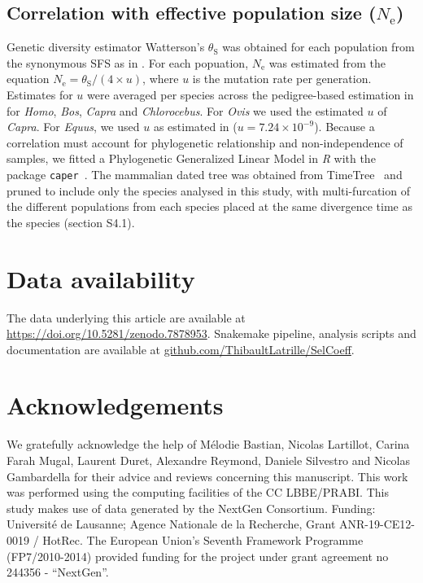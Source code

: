 \documentclass{article}
\newcommand{\Ne}{N_{\text{e}}}
\newcommand{\thetaSyn}{\theta_{\text{S}}}
\providecommand{\DIFaddtex}[1]{{\protect\color{blue}\uwave{#1}}} %
\providecommand{\DIFaddbegin}{} %
\providecommand{\DIFaddend}{} %
\providecommand{\DIFadd}[1]{\texorpdfstring{\DIFaddtex{#1}}{#1}} %
\newcommand{\DIFaddincludegraphics}[2][]{{\color{blue}\fbox{\DIFOincludegraphics[#1]{#2}}}} %
\DeclareRobustCommand{\DIFaddbegin}{\DIFOaddbegin \let\includegraphics\DIFaddincludegraphics} %
\DeclareRobustCommand{\DIFaddend}{\DIFOaddend \let\includegraphics\DIFOincludegraphics} %
\begin{document}
    \subsection{Correlation with effective population size ($\Ne$)}
    \label{subsec:correlation-diversity}
    Genetic diversity estimator Watterson's $\thetaSyn$ was obtained for each population from the synonymous SFS as in \textcite{achaz_frequency_2009}.
    For each popuation, $\Ne$ was estimated from the equation $\Ne=\thetaSyn / (4 \times u)$, where $u$ is the mutation rate per generation.
    Estimates for $u$ were averaged per species across the pedigree-based estimation in \textcite{bergeron_evolution_2023} for \textit{Homo}, \textit{Bos}, \textit{Capra} and \textit{Chlorocebus}.
    For \textit{Ovis} we used the estimated $u$ of \textit{Capra}.
    For \textit{Equus}, we used $u$ as estimated in \textcite{orlando_recalibrating_2013} ($u=7.24\times10^{-9}$).
    Because a correlation must account for phylogenetic relationship and non-independence of samples, we fitted a Phylogenetic Generalized Linear Model in \textit{R} with the \DIFaddbegin \DIFadd{method }\texttt{\DIFadd{pgls}} \DIFadd{with default settings from the }\DIFaddend package \texttt{caper}~\cite{orme_caper_2013}.
    The mammalian dated tree was obtained from TimeTree~\cite{kumar_timetree_2017} and pruned to include only the species analysed in this study, with multi-furcation of the different populations from each species placed at the same divergence time as the species (section S4.1).

    \section*{Data availability}
    The data underlying this article are available at \url{https://doi.org/10.5281/zenodo.7878953}.
    Snakemake pipeline, analysis scripts and documentation are available at \href{https://github.com/ThibaultLatrille/SelCoeff}{github.com/ThibaultLatrille/SelCoeff}.

    \section*{Acknowledgements}
    \label{sec:acknowledgment}
    We gratefully acknowledge the help of Mélodie Bastian, Nicolas Lartillot, Carina Farah Mugal, Laurent Duret, Alexandre Reymond, Daniele Silvestro and Nicolas Gambardella for their advice and reviews concerning this manuscript.
    This work was performed using the computing facilities of the CC LBBE/PRABI\@.
    This study makes use of data generated by the NextGen Consortium.
    Funding:
    Université de Lausanne; Agence Nationale de la Recherche, Grant ANR-19-CE12-0019 / HotRec.
    The European Union’s Seventh Framework Programme (FP7/2010-2014) provided funding for the project under grant agreement no 244356 - “NextGen”.
\end{document}
